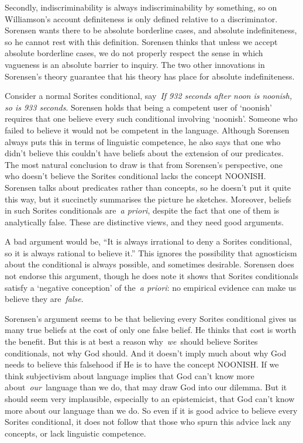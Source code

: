 \documentclass[
  10pt,
  letterpaper,
  DIV=11,
  numbers=noendperiod,
  twoside]{scrartcl}
\begin{document}
Secondly, indiscriminability is always indiscriminability by something,
so on Williamson's account definiteness is only defined relative to a
discriminator. Sorensen wants there to be absolute borderline cases, and
absolute indefiniteness, so he cannot rest with this definition.
Sorensen thinks that unless we accept absolute borderline cases, we do
not properly respect the sense in which vagueness is an absolute barrier
to inquiry. The two other innovations in Sorensen's theory guarantee
that his theory has place for absolute indefiniteness.

Consider a normal Sorites conditional, say~\emph{If 932 seconds after
noon is noonish, so is 933 seconds}. Sorensen holds that being a
competent user of `noonish' requires that one believe every such
conditional involving `noonish'. Someone who failed to believe it would
not be competent in the language. Although Sorensen always puts this in
terms of linguistic competence, he also says that one who didn't believe
this couldn't have beliefs about the extension of our predicates. The
most natural conclusion to draw is that from Sorensen's perspective, one
who doesn't believe the Sorites conditional lacks the concept NOONISH.
Sorensen talks about predicates rather than concepts, so he doesn't put
it quite this way, but it succinctly summarises the picture he sketches.
Moreover, beliefs in such Sorites conditionals are~\emph{a priori},
despite the fact that one of them is analytically false. These are
distinctive views, and they need good arguments.

A bad argument would be, ``It is always irrational to deny a Sorites
conditional, so it is always rational to believe it.'' This ignores the
possibility that agnosticism about the conditional is always possible,
and sometimes desirable. Sorensen does not endorse this argument, though
he does note it shows that Sorites conditionals satisfy a `negative
conception' of the~\emph{a priori}: no empirical evidence can make us
believe they are~\emph{false}.

Sorensen's argument seems to be that believing every Sorites conditional
gives us many true beliefs at the cost of only one false belief. He
thinks that cost is worth the benefit. But this is at best a reason
why~\emph{we}~should believe Sorites conditionals, not why God should.
And it doesn't imply much about why God needs to believe this falsehood
if He is to have the concept NOONISH. If we think subjectivism about
language implies that God can't know more about~\emph{our}~language than
we do, that may draw God into our dilemma. But it should seem very
implausible, especially to an epistemicist, that God can't know more
about our language than we do. So even if it is good advice to believe
every Sorites conditional, it does not follow that those who spurn this
advice lack any concepts, or lack linguistic competence.
\end{document}
